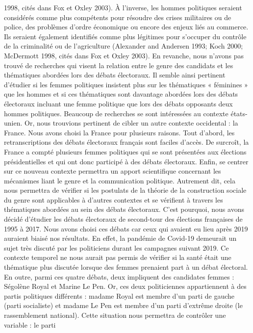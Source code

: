 \documentclass[
  letterpaper,
  DIV=11,
  numbers=noendperiod]{scrartcl}
\begin{document}
1998, cités dans Fox et Oxley 2003). À l'inverse, les hommes politiques
seraient considérés comme plus compétents pour résoudre des crises
militaires ou de police, des problèmes d'ordre économique ou encore des
enjeux liés au commerce. Ils seraient également identifiés comme plus
légitimes pour s'occuper du contrôle de la criminalité ou de
l'agriculture (Alexander and Andersen 1993; Koch 2000; McDermott 1998,
cités dans Fox et Oxley 2003). En revanche, nous n'avons pas trouvé de
recherches qui visent la relation entre le genre des candidats et les
thématiques abordées lors des débats électoraux. Il semble ainsi
pertinent d'étudier si les femmes politiques insistent plus sur les
thématiques « féminines » que les hommes et si ces thématiques sont
davantage abordées lors des débats électoraux incluant une femme
politique que lors des débats opposants deux hommes politiques. Beaucoup
de recherches se sont intéressées au contexte états-unien. Or, nous
trouvions pertinent de cibler un autre contexte occidental : la France.
Nous avons choisi la France pour plusieurs raisons. Tout d'abord, les
retranscriptions des débats électoraux français sont faciles d'accès. De
surcroît, la France a compté plusieurs femmes politiques qui se sont
présentées aux élections présidentielles et qui ont donc participé à des
débats électoraux. Enfin, se centrer sur ce nouveau contexte permettra
un apport scientifique concernant les mécanismes liant le genre et la
communication politique. Autrement dit, cela nous permettra de vérifier
si les postulats de la théorie de la construction sociale du genre sont
applicables à d'autres contextes et se vérifient à travers les
thématiques abordées au sein des débats électoraux. C'est pourquoi, nous
avons décidé d'étudier les débats électoraux de second-tour des
élections françaises de 1995 à 2017. Nous avons choisi ces débats car
ceux qui avaient eu lieu après 2019 auraient biaisé nos résultats. En
effet, la pandémie de Covid-19 demeurait un sujet très discuté par les
politiciens durant les campagnes suivant 2019. Ce contexte temporel ne
nous aurait pas permis de vérifier si la santé était une thématique plus
discutée lorsque des femmes prenaient part à un débat électoral. En
outre, parmi ces quatre débats, deux impliquent des candidates femmes :
Ségolène Royal et Marine Le Pen. Or, ces deux politiciennes
appartiennent à des partis politiques différents : madame Royal est
membre d'un parti de gauche (parti socialiste) et madame Le Pen est
membre d'un parti d'extrême droite (le rassemblement national). Cette
situation nous permettra de contrôler une variable : le parti
\end{document}
